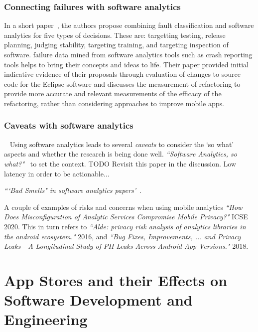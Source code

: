 \subsubsection{Connecting failures with software analytics}
In a short paper~, the authors propose combining fault classification and software analytics for five types of decisions. These are: targetting testing, release planning, judging stability, targeting training, and targeting inspection of software. failure data mined from software analytics tools such as crash reporting tools helps to bring their concepts and ideas to life. Their paper provided initial indicative evidence of their proposals through evaluation of changes to source code for the Eclipse software and discusses the measurement of refactoring to provide more accurate and relevant measurements of the efficacy of the refactoring, rather than considering approaches to improve mobile apps.

\subsubsection{Caveats with software analytics}~\label{rw-caveats-with-software-analytics-topic}
Using software analytics leads to several \textit{caveats} to consider the `so what' aspects and whether the research is being done well. 
\emph{``Software Analytics, so what?"}~\cite{menzies2013_software_analytics_so_what} to set the context. TODO Revisit this paper in the discussion. Low latency in order to be actionable...

\emph{```Bad Smells" in software analytics papers'}~.

A couple of examples of risks and concerns when using mobile analytics 
\emph{``How Does Misconfiguration of Analytic Services Compromise Mobile Privacy?"} ICSE 2020. This in turn refers to \emph{``Alde: privacy risk analysis of analytics libraries in the android ecosystem."} 2016, and \emph{``Bug Fixes, Improvements, ... and Privacy Leaks - A Longitudinal Study of PII Leaks Across Android App Versions."} 2018.


\section{App Stores and their Effects on Software Development and Engineering}~\label{rw-app-stores-and-their-effects-on-software-development-and-engineering}

